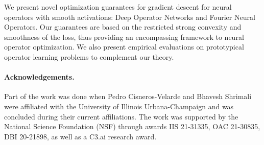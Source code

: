 We present novel optimization guarantees for %
gradient descent for neural operators with smooth activations: %
Deep Operator Networks and Fourier Neural Operators.
Our guarantees are based on the restricted strong convexity and smoothness of the loss, 
thus
%
%
providing 
an encompassing framework to neural operator optimization. 
We also present empirical evaluations on prototypical 
operator learning problems 
to complement our theory.


\paragraph{Acknowledgements.} Part of the work was done when Pedro Cisneros-Velarde and Bhavesh Shrimali were affiliated with the University of Illinois Urbana-Champaign and was concluded during their current affiliations. The work was supported by the National Science Foundation (NSF) through awards IIS 21-31335, OAC 21-30835, DBI 20-21898, as well as a C3.ai research award.
